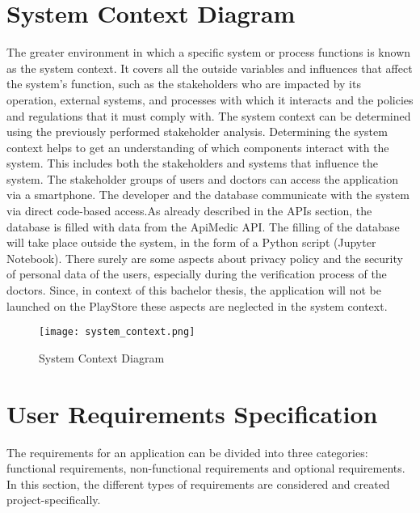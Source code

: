 \section{System Context Diagram}
The greater environment in which a specific system or process functions is known as the system context. It covers all the outside variables and influences that affect the system's function, such as the stakeholders who are impacted by its operation, external systems, and processes with which it interacts and the policies and regulations that it must comply with. The system context can be determined using the previously performed stakeholder analysis. Determining the system context helps to get an understanding of which components interact with the system. This includes both the stakeholders and systems that influence the system.
The stakeholder groups of users and doctors can access the application via a smartphone. The developer and the database communicate with the system via direct code-based access.As already described in the APIs section, the database is filled with data from the ApiMedic API. The filling of the database will take place outside the system, in the form of a Python script (Jupyter Notebook). There surely are some aspects about privacy policy and the security of personal data of the users, especially during the verification process of the doctors. Since, in context of this bachelor thesis, the application will not be launched on the PlayStore these aspects are neglected in the system context.

\begin{figure}[h!]
	\centering
	\texttt{[image: system\_context.png]}
	\caption[System Context Diagram ]{System Context Diagram}
\end{figure}

\section{User Requirements Specification}
The requirements for an application can be divided into three categories: functional requirements, non-functional requirements and optional requirements. In this section, the different types of requirements are considered and created project-specifically.

